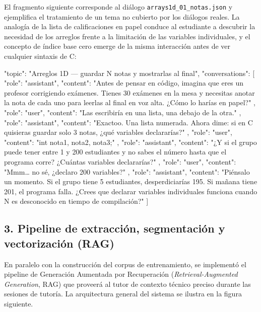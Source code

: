 \documentclass[12pt]{article}
\begin{document}
El fragmento siguiente corresponde al diálogo \texttt{arrays1d\_01\_notas.json}
y ejemplifica el tratamiento de un tema no cubierto por los diálogos reales. La
analogía de la lista de calificaciones en papel conduce al estudiante a
descubrir la necesidad de los arreglos frente a la limitación de las variables
individuales, y el concepto de índice base cero emerge de la misma interacción
antes de ver cualquier sintaxis de C:

\begin{jsoncode}
{
  "topic": "Arreglos 1D — guardar N notas y mostrarlas al final",
  "conversations": [
    {
      "role": "assistant",
      "content": "Antes de pensar en código, imagina que eres un profesor
corrigiendo exámenes. Tienes 30 exámenes en la mesa y necesitas anotar
la nota de cada uno para leerlas al final en voz alta. ¿Cómo lo harías
en papel?"
    },
    {
      "role": "user",
      "content": "Las escribiría en una lista, una debajo de la otra."
    },
    {
      "role": "assistant",
      "content": "Exactoo. Una lista numerada. Ahora dime: si en C quisieras
guardar solo 3 notas, ¿qué variables declararías?"
    },
    {
      "role": "user",
      "content": "int nota1, nota2, nota3;"
    },
    {
      "role": "assistant",
      "content": "¿Y si el grupo puede tener entre 1 y 200 estudiantes y
no sabes el número hasta que el programa corre? ¿Cuántas variables
declararías?"
    },
    {
      "role": "user",
      "content": "Mmm… no sé, ¿declaro 200 variables?"
    },
    {
      "role": "assistant",
      "content": "Piénsalo un momento. Si el grupo tiene 5 estudiantes,
desperdiciarías 195. Si mañana tiene 201, el programa falla. ¿Crees que
declarar variables individuales funciona cuando N es desconocido en
tiempo de compilación?"
    }
  ]
}
\end{jsoncode}

\subsection*{3. Pipeline de extracción, segmentación y vectorización (RAG)}

En paralelo con la construcción del corpus de entrenamiento, se implementó el
pipeline de Generación Aumentada por Recuperación (\textit{Retrieval-Augmented
Generation}, RAG) que proveerá al tutor de contexto técnico preciso durante las
sesiones de tutoría. La arquitectura general del sistema se ilustra en la
figura siguiente.
\end{document}
